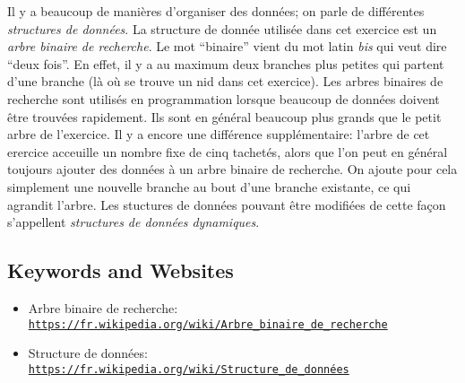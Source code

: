 \documentclass[a4paper,11pt]{report}
\newcommand{\BrochureUrlText}[1]{\texttt{#1}}
\begin{document}
Il y a beaucoup de manières d’organiser des données; on parle de différentes \emph{structures de données}. La structure de donnée utilisée dans cet exercice est un \emph{arbre binaire de recherche}. Le mot “binaire” vient du mot latin \emph{bis} qui veut dire “deux fois”. En effet, il y a au maximum deux branches plus petites qui partent d’une branche (là où se trouve un nid dans cet exercice). Les arbres binaires de recherche sont utilisés en programmation lorsque beaucoup de données doivent être trouvées rapidement. Ils sont en général beaucoup plus grands que le petit arbre de l’exercice. Il y a encore une différence supplémentaire: l’arbre de cet erercice acceuille un nombre fixe de cinq tachetés, alors que l’on peut en général toujours ajouter des données à un arbre binaire de recherche. On ajoute pour cela simplement une nouvelle branche au bout d’une branche existante, ce qui agrandit l’arbre. Les stuctures de données pouvant être modifiées de cette façon s’appellent \emph{structures de données dynamiques}.

{\raggedright

\subsection*{Keywords and Websites}

\begin{itemize}
  \item Arbre binaire de recherche: \href{https://fr.wikipedia.org/wiki/Arbre_binaire_de_recherche}{\BrochureUrlText{https://fr.wikipedia.org/wiki/Arbre\_binaire\_de\_recherche}}
  \item Structure de données: \href{https://fr.wikipedia.org/wiki/Structure_de_donn\%C3\%A9es}{\BrochureUrlText{https://fr.wikipedia.org/wiki/Structure\_de\_données}}
\end{itemize}


}
\end{document}
